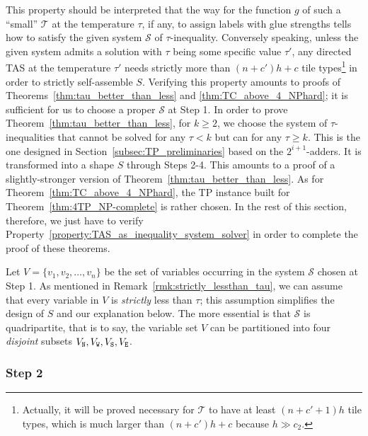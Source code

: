 \documentclass{article}
\theoremstyle{remark}
\theoremstyle{definition}
\newcommand{\tas}{\ensuremath{\mathcal{T}}}
\newcommand{\north}{{\tt N}}
\newcommand{\west}{{\tt W}}
\newcommand{\south}{{\tt S}}
\newcommand{\east}{{\tt E}}
\begin{document}
This property should be interpreted that the way for the function $g$ of such a ``small'' $\tas$ at the temperature $\tau$, if any, to assign labels with glue strengths tells how to satisfy the given system $\mathcal{S}$ of $\tau$-inequality. 
Conversely speaking, unless the given system admits a solution with $\tau$ being some specific value $\tau'$, any directed TAS at the temperature $\tau'$ needs strictly more than $(n+c')h+c$ tile types\footnote{
Actually, it will be proved necessary for $\tas$ to have at least $(n+c'+1)h$ tile types, which is much larger than $(n+c')h+c$ because $h \gg c_2$. 
} in order to strictly self-assemble $S$. 
Verifying this property amounts to proofs of Theorems~\ref{thm:tau_better_than_less} and \ref{thm:TC_above_4_NPhard}; it is sufficient for us to choose a proper $\mathcal{S}$ at Step 1. 
In order to prove Theorem~\ref{thm:tau_better_than_less}, for $k \ge 2$, we choose the system of $\tau$-inequalities that cannot be solved for any $\tau < k$ but can for any $\tau \ge k$. 
This is the one designed in Section~\ref{subsec:TP_preliminaries} based on the $2^{i+1}$-adders. 
It is transformed into a shape $S$ through Steps 2-4. 
This amounts to a proof of a slightly-stronger version of Theorem~\ref{thm:tau_better_than_less}. 
As for Theorem~\ref{thm:TC_above_4_NPhard}, the TP instance built for Theorem~\ref{thm:4TP_NP-complete} is rather chosen. 
In the rest of this section, therefore, we just have to verify Property~\ref{property:TAS_as_inequality_system_solver} in order to complete the proof of these theorems. 

Let $V = \{v_1, v_2, \ldots, v_n\}$ be the set of variables occurring in the system $\mathcal{S}$ chosen at Step 1. 
As mentioned in Remark~\ref{rmk:strictly_lessthan_tau}, we can assume that every variable in $V$ is {\it strictly} less than $\tau$; this assumption simplifies the design of $S$ and our explanation below. 
The more essential is that $\mathcal{S}$ is quadripartite, that is to say, the variable set $V$ can be partitioned into four {\it disjoint} subsets $V_\north, V_\west, V_\south, V_\east$. 

\subsubsection*{Step 2}
\end{document}
